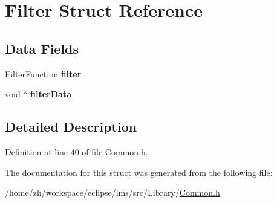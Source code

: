\hypertarget{structFilter}{\section{Filter Struct Reference}
\label{structFilter}
}
\subsection*{Data Fields}
\begin{DoxyCompactItemize}
\item 
\hypertarget{structFilter_af7a4d06f1c38dd9234cb5ff044c9e739}{Filter\-Function {\bfseries filter}}\label{structFilter_af7a4d06f1c38dd9234cb5ff044c9e739}

\item 
\hypertarget{structFilter_a76700c71c75772c1bc1ff1f57dea861e}{void $\ast$ {\bfseries filter\-Data}}\label{structFilter_a76700c71c75772c1bc1ff1f57dea861e}

\end{DoxyCompactItemize}


\subsection{Detailed Description}


Definition at line 40 of file Common.\-h.



The documentation for this struct was generated from the following file\-:\begin{DoxyCompactItemize}
\item 
/home/zh/workspace/eclipse/lms/src/\-Library/\hyperlink{Common_8h}{Common.\-h}\end{DoxyCompactItemize}
